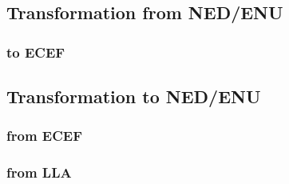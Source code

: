 \subsection{Transformation from NED/ENU}
\subsubsection*{to ECEF}



\subsection{Transformation to NED/ENU}
\subsubsection*{from ECEF}


\subsubsection*{from LLA}

